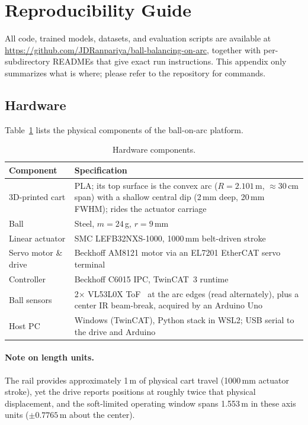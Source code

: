 \section{Reproducibility Guide}
\label{appendix:reproducibility}

All code, trained models, datasets, and evaluation scripts are available at
\url{https://github.com/JDRanpariya/ball-balancing-on-arc}, together with
per-subdirectory READMEs that give exact run instructions. This appendix
only summarizes what is where; please refer to the repository for commands.

\subsection{Hardware}

Table~\ref{tab:hw_components} lists the physical components of the
ball-on-arc platform.

\begin{table}[H]
\centering
\caption{Hardware components.}
\label{tab:hw_components}
\begin{tabular}{lp{5.2cm}}
\toprule
\textbf{Component} & \textbf{Specification} \\
\midrule
3D-printed cart & PLA; its top surface is the convex arc ($R = 2.101$\,m, $\approx$30\,cm span) with a shallow central dip (2\,mm deep, 20\,mm FWHM); rides the actuator carriage \\
Ball & Steel, $m = 24$\,g, $r = 9$\,mm \\
Linear actuator & SMC LEFB32NXS-1000, 1000\,mm belt-driven stroke~\cite{smc_lefb_catalogue} \\
Servo motor \& drive & Beckhoff AM8121 motor via an EL7201 EtherCAT servo terminal \\
Controller & Beckhoff C6015 IPC, TwinCAT~3 runtime \\
Ball sensors & 2$\times$ VL53L0X ToF~\cite{vl53l0x_datasheet} at the arc edges (read alternately), plus a center IR beam-break, acquired by an Arduino Uno \\
Host PC & Windows (TwinCAT), Python stack in WSL2; USB serial to the drive and Arduino \\
\bottomrule
\end{tabular}
\end{table}

\paragraph{Note on length units.}
The rail provides approximately 1\,m of physical cart travel
(1000\,mm actuator stroke), yet the drive reports positions at roughly
twice that physical displacement, and the soft-limited operating window
spans 1.553\,m in these axis units ($\pm 0.7765$\,m about the center).


